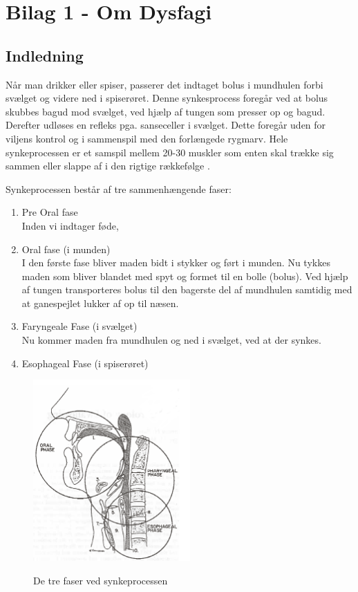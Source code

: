 \documentclass[main.tex]{subfiles}
\begin{document}
\chapter*{Bilag 1 - Om Dysfagi}
\label{Bilag1}
\section*{Indledning}
Når man drikker eller spiser, passerer det indtaget bolus i mundhulen forbi svælget og videre ned i spiserøret. Denne synkesprocess foregår ved at bolus skubbes bagud mod svælget, ved hjælp af tungen som presser op og bagud. Derefter udløses en refleks pga. sanseceller i svælget. Dette foregår uden for viljens kontrol og i sammenspil med den forlængede rygmarv. Hele synkeprocessen er et samspil mellem 20-30 muskler som enten skal trække sig sammen eller slappe af i den rigtige rækkefølge \cite{Sand2008MennesketsFysiologi}. 

Synkeprocessen består af tre sammenhængende faser:
\begin{enumerate}
\item Pre Oral fase\\
Inden vi indtager føde, 
\item Oral fase (i munden)\\
I den første fase bliver maden bidt i stykker og ført i munden. Nu tykkes maden som bliver blandet med spyt og formet til en bolle (bolus). Ved hjælp af tungen transporteres bolus til den bagerste del af mundhulen samtidig med at ganespejlet lukker af op til næsen.
\item Faryngeale Fase (i svælget)\\
Nu kommer maden fra mundhulen og ned i svælget, ved at der synkes. 
\item Esophageal Fase (i spiserøret)\cite{Bass1992Dysphagia:Management}
\end{enumerate}

\begin{figure}[H]
\centering
{\includegraphics[width=6cm]
{Figure/dysfagi3faser}}
\caption{De tre faser ved synkeprocessen\cite{Bass1992Dysphagia:Management}}
\label{trefaser}
\end{figure}
\end{document}
